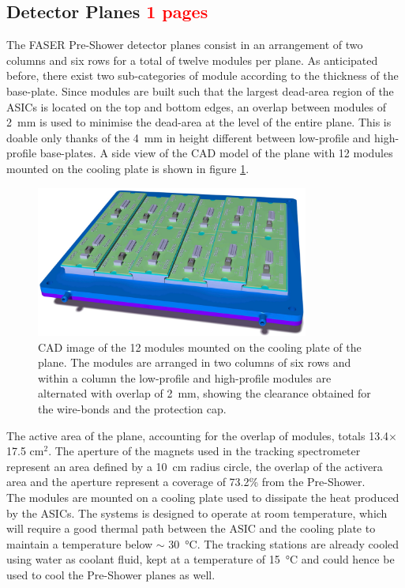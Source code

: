 		\subsection{Detector Planes \textcolor{red}{ 1 pages}}
		The FASER Pre-Shower detector planes consist in an arrangement of two columns and six rows for a total of twelve modules per plane. As anticipated before, there exist two sub-categories of module according to the thickness of the base-plate. Since modules are built such that the largest dead-area region of the ASICs is located on the top and bottom edges, an overlap between modules of \SI{2}{\milli\meter} is used to minimise the dead-area at the level of the entire plane. This is doable only thanks of the \SI{4}{\milli\meter} in height different between low-profile and high-profile base-plates. A side view of the CAD model of the plane with 12 modules mounted on the cooling plate is shown in figure \ref{im:plane_CAD}.
		\begin{figure}[h]
			\centering
			\includegraphics[width=0.8\textwidth]{files/plane_CAD}
			\caption{CAD image of the 12 modules mounted on the cooling plate of the plane. The modules are arranged in two columns of six rows and within a column the low-profile and high-profile modules are alternated with overlap of \SI{2}{\milli\meter}, showing the clearance obtained for the wire-bonds and the protection cap.}
			\label{im:plane_CAD}
		\end{figure}
		
		The active area of the plane, accounting for the overlap of modules, totals 13.4$\times$17.5 cm$^2$. The aperture of the magnets used in the tracking spectrometer represent an area defined by a \SI{10}{\centi\meter} radius circle, the overlap of the activera area and the aperture represent a coverage of 73.2\% from the Pre-Shower. \\
		
		The modules are mounted on a cooling plate used to dissipate the heat produced by the ASICs. The systems is designed to operate at room temperature, which will require a good thermal path between the ASIC and the cooling plate to maintain a temperature below $\sim$ \SI{30}{\celsius}. The tracking stations are already cooled using water as coolant fluid, kept at a temperature of \SI{15}{\celsius} and could hence be used to cool the Pre-Shower planes as well. 
		
